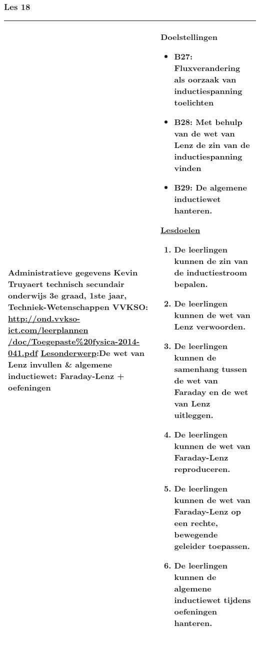 


\begin{landscape}
	\subsubsection{Les 18}
	\begin{tabularx}{1.56\textwidth}{|p{}|X|}\hline
		\textbf{Administratieve gegevens}\newline\newline
		Kevin Truyaert\newline\newline
		technisch secundair onderwijs\newline
		3e graad, 1ste jaar, Techniek-Wetenschappen\newline
		VVKSO: \href{http://ond.vvkso-ict.com/leerplannen/doc/Toegepaste\%20fysica-2014-041.pdf}{http://ond.vvkso-ict.com/leerplannen /doc/Toegepaste\%20fysica-2014-041.pdf} \newline
		\underline{Lesonderwerp}:\newline  De wet van Lenz invullen \& algemene inductiewet: Faraday-Lenz + oefeningen & \textbf{Doelstellingen}
		\begin{itemize}[itemsep=0.08\baselineskip]
			\item B27: Fluxverandering als oorzaak van inductiespanning toelichten
			\item B28: Met behulp van de wet van Lenz de zin van de inductiespanning vinden
			\item B29: De algemene inductiewet hanteren.
		\end{itemize}
		\underline{Lesdoelen}\newline
		\vspace{-0.75cm}
		\begin{enumerate}[itemsep=0.08\baselineskip]
			\item De leerlingen kunnen de zin van de inductiestroom bepalen.
			\item De leerlingen kunnen de wet van Lenz verwoorden.
			\item De leerlingen kunnen de samenhang tussen de wet van Faraday en de wet van Lenz uitleggen.
			\item De leerlingen kunnen de wet van Faraday-Lenz reproduceren.
			\item De leerlingen kunnen de wet van Faraday-Lenz op een rechte, bewegende geleider toepassen.
			\item De leerlingen kunnen de algemene inductiewet tijdens oefeningen hanteren.
		\end{enumerate} \\\hline
	\end{tabularx}\vfill \textcolor{white}{.} 



\end{landscape}
